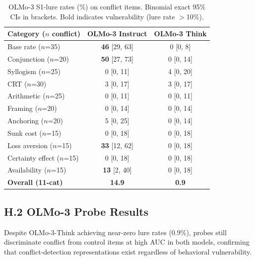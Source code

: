 \documentclass{article}
\begin{document}
\begin{table}[ht]
\centering
\caption{OLMo-3 S1-lure rates (\%) on conflict items.
  Binomial exact 95\% CIs in brackets.  Bold indicates vulnerability
  (lure rate $>$10\%).}
\label{tab:olmo_behavioral}
\vspace{4pt}
\small
\begin{tabular}{lcc}
\toprule
\textbf{Category ($n$ conflict)} & \textbf{OLMo-3 Instruct} & \textbf{OLMo-3 Think} \\
\midrule
Base rate ($n$=35)       & \textbf{46} {\scriptsize [29, 63]} & 0 {\scriptsize [0, 8]}  \\
Conjunction ($n$=20)     & \textbf{50} {\scriptsize [27, 73]} & 0 {\scriptsize [0, 14]} \\
Syllogism ($n$=25)       & 0 {\scriptsize [0, 11]}            & 4 {\scriptsize [0, 20]} \\
CRT ($n$=30)             & 3 {\scriptsize [0, 17]}            & 3 {\scriptsize [0, 17]} \\
Arithmetic ($n$=25)      & 0 {\scriptsize [0, 11]}            & 0 {\scriptsize [0, 11]} \\
Framing ($n$=20)         & 0 {\scriptsize [0, 14]}            & 0 {\scriptsize [0, 14]} \\
Anchoring ($n$=20)       & 5 {\scriptsize [0, 25]}            & 0 {\scriptsize [0, 14]} \\
Sunk cost ($n$=15)       & 0 {\scriptsize [0, 18]}            & 0 {\scriptsize [0, 18]} \\
Loss aversion ($n$=15)   & \textbf{33} {\scriptsize [12, 62]} & 0 {\scriptsize [0, 18]} \\
Certainty effect ($n$=15)& 0 {\scriptsize [0, 18]}            & 0 {\scriptsize [0, 18]} \\
Availability ($n$=15)    & \textbf{13} {\scriptsize [2, 40]}  & 0 {\scriptsize [0, 18]} \\
\midrule
\textbf{Overall (11-cat)} & \textbf{14.9} & \textbf{0.9} \\
\bottomrule
\end{tabular}
\end{table}

\subsection*{H.2 OLMo-3 Probe Results}

Despite OLMo-3-Think achieving near-zero lure rates (0.9\%), probes
still discriminate conflict from control items at high AUC in both
models, confirming that conflict-detection representations exist
regardless of behavioral vulnerability.
\end{document}
